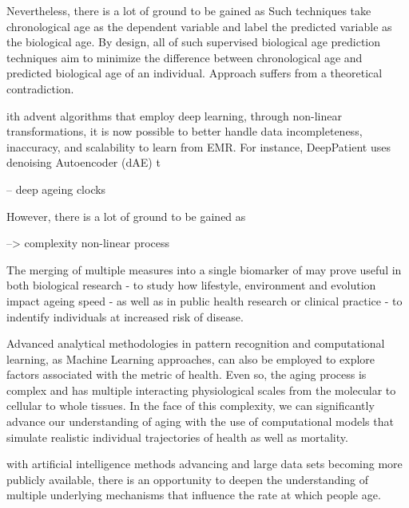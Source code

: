 Nevertheless, there is a lot of ground to be gained as 
Such techniques take chronological age as the dependent variable and label the predicted variable as the biological age. By design, all of such supervised biological age prediction techniques aim to minimize the difference between chronological age and predicted biological age of an individual. Approach suffers from a theoretical contradiction. 



ith advent algorithms that employ deep learning, through non-linear transformations, it is now possible to better handle data incompleteness, inaccuracy, and scalability to learn from EMR. For instance, DeepPatient uses denoising Autoencoder (dAE) t

-- deep ageing clocks

However, there is a lot of ground to be gained as 

--> complexity non-linear process

The merging of multiple measures into a single biomarker of may prove useful in both biological research - to study how lifestyle, environment and evolution impact ageing speed - as well as in public health research or clinical practice - to indentify individuals at increased risk of disease. 

Advanced analytical methodologies in pattern recognition and computational learning, as Machine Learning approaches, can also be employed to explore factors associated with the metric of health.
Even so, the aging process is complex and has multiple interacting physiological scales from the molecular to cellular to whole tissues. In the face of this complexity, we can significantly advance our understanding of aging with the use of computational models that simulate realistic individual trajectories of health as well as mortality. 





with artificial intelligence methods advancing and large data sets becoming more publicly available, there is an opportunity to deepen the understanding of multiple underlying mechanisms that influence the rate at which people age. 




